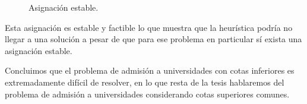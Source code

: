 \begin{eje}
\begin{figure}[H]

\caption{Asignación estable.}
\end{figure}

Esta asignación es estable y factible lo que muestra que la heurística podría no llegar a una solución a pesar de que para ese problema en particular sí exista una asignación estable. \fin
\end{eje}

Concluimos que el problema de admisión a universidades con cotas inferiores es extremadamente difícil de resolver, en lo que resta de la tesis hablaremos del problema de admisión a universidades considerando cotas superiores comunes. 




